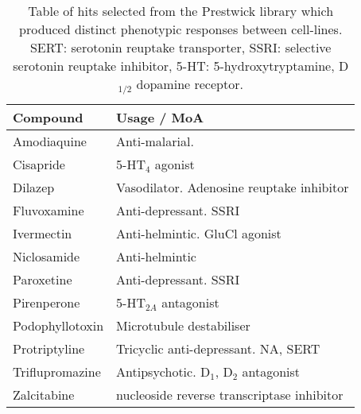 \documentclass[a4paper,11pt,twoside,openright]{scrbook}
\begin{document}
\begin{table}
    \captionsetup{width=0.8\textwidth}
    \caption[Table of initial hits from the Prestwick library which produced distinct phenotypic response between 
cell-lines.]{
        Table of hits selected from the Prestwick library which produced distinct phenotypic responses between 
cell-lines. SERT: serotonin reuptake transporter, SSRI: selective serotonin reuptake inhibitor, 5-HT: 
5-hydroxytryptamine, D$_{1/2}$ dopamine receptor.
    }
    \begin{footnotesize}
    \begin{tabular}{@{}ll@{}}
    \toprule
    Compound        & Usage / MoA                                     \\ \midrule
    Amodiaquine     & Anti-malarial.                                  \\
    Cisapride       & 5-HT$_4$ agonist                                \\
    Dilazep         & Vasodilator. Adenosine reuptake inhibitor       \\
    Fluvoxamine     & Anti-depressant. SSRI                           \\
    Ivermectin      & Anti-helmintic. GluCl agonist                   \\
    Niclosamide     & Anti-helmintic                                  \\
    Paroxetine      & Anti-depressant. SSRI                           \\ 
    Pirenperone     & 5-HT$_{2A}$ antagonist                          \\
    Podophyllotoxin & Microtubule destabiliser                        \\
    Protriptyline   & Tricyclic anti-depressant. NA, SERT             \\
    Triflupromazine & Antipsychotic. D$_1$, D$_2$ antagonist          \\
    Zalcitabine     & nucleoside reverse transcriptase inhibitor      \\ \bottomrule
    \end{tabular}
    \end{footnotesize}
    \label{table:hit_list}
\end{table}
\end{document}
